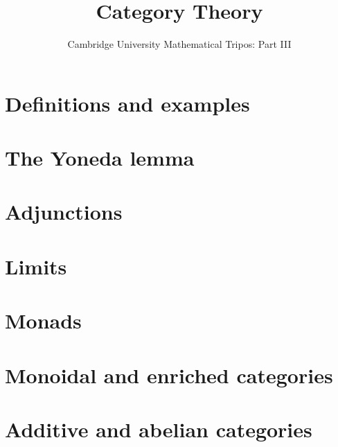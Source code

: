 \documentclass{article}
\title{Category Theory}
\author{Cambridge University Mathematical Tripos: Part III}
\begin{document}
\maketitle

\tableofcontentsnewpage{}

\section{Definitions and examples}

\section{The Yoneda lemma}

\section{Adjunctions}

\section{Limits}

\section{Monads}

\section{Monoidal and enriched categories}

\section{Additive and abelian categories}

\end{document}
